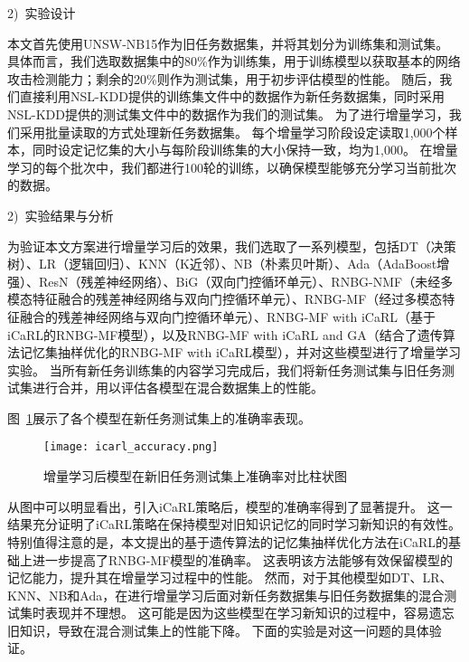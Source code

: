 2)~实验设计\par

本文首先使用UNSW-NB15作为旧任务数据集，并将其划分为训练集和测试集。
具体而言，我们选取数据集中的80\%作为训练集，用于训练模型以获取基本的网络攻击检测能力；剩余的20\%则作为测试集，用于初步评估模型的性能。
随后，我们直接利用NSL-KDD提供的训练集文件中的数据作为新任务数据集，同时采用NSL-KDD提供的测试集文件中的数据作为我们的测试集。
为了进行增量学习，我们采用批量读取的方式处理新任务数据集。
每个增量学习阶段设定读取1,000个样本，同时设定记忆集的大小与每阶段训练集的大小保持一致，均为1,000。
在增量学习的每个批次中，我们都进行100轮的训练，以确保模型能够充分学习当前批次的数据。\par
2)~实验结果与分析\par
为验证本文方案进行增量学习后的效果，我们选取了一系列模型，包括DT（决策树）、LR（逻辑回归）、KNN（K近邻）、NB（朴素贝叶斯）、Ada（AdaBoost增强）、ResN（残差神经网络）、BiG（双向门控循环单元）、RNBG-NMF（未经多模态特征融合的残差神经网络与双向门控循环单元）、RNBG-MF（经过多模态特征融合的残差神经网络与双向门控循环单元）、RNBG-MF with iCaRL（基于iCaRL的RNBG-MF模型），以及RNBG-MF with iCaRL and GA（结合了遗传算法记忆集抽样优化的RNBG-MF with iCaRL模型），并对这些模型进行了增量学习实验。
当所有新任务训练集的内容学习完成后，我们将新任务测试集与旧任务测试集进行合并，用以评估各模型在混合数据集上的性能。\par

图~\ref{fig:acc_icarl}展示了各个模型在新任务测试集上的准确率表现。
\begin{figure}[h]
	\centering
	\texttt{[image: icarl\_accuracy.png]}
	\caption{增量学习后模型在新旧任务测试集上准确率对比柱状图}
	\label{fig:acc_icarl}
\end{figure}
从图中可以明显看出，引入iCaRL策略后，模型的准确率得到了显著提升。
这一结果充分证明了iCaRL策略在保持模型对旧知识记忆的同时学习新知识的有效性。
特别值得注意的是，本文提出的基于遗传算法的记忆集抽样优化方法在iCaRL的基础上进一步提高了RNBG-MF模型的准确率。
这表明该方法能够有效保留模型的记忆能力，提升其在增量学习过程中的性能。
然而，对于其他模型如DT、LR、KNN、NB和Ada，在进行增量学习后面对新任务数据集与旧任务数据集的混合测试集时表现并不理想。
这可能是因为这些模型在学习新知识的过程中，容易遗忘旧知识，导致在混合测试集上的性能下降。
下面的实验是对这一问题的具体验证。

